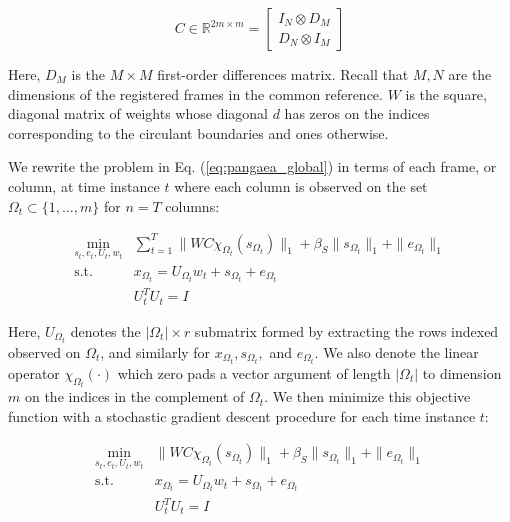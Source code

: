 \documentclass[10pt,twocolumn,letterpaper]{article}
\begin{document}
\begin{equation}
	C \in \mathbb{R}^{2m \times m} = \begin{bmatrix} I_N \otimes D_M \\ D_N \otimes I_M \end{bmatrix}
\end{equation}

\noindent Here, $D_M$ is the $M \times M$ first-order differences matrix. Recall that $M,N$ are the dimensions of the registered frames in the common reference. $W$ is the square, diagonal matrix of weights whose diagonal $d$ has zeros on the indices corresponding to the circulant boundaries and ones otherwise.

We rewrite the problem in Eq. (\ref{eq:pangaea_global}) in terms of each frame, or column, at time instance $t$ where each column is observed on the set $\Omega_t \subset \{1,\hdots,m\}$ for $n=T$ columns:

\begin{equation}
    \begin{split}
        \min_{s_{t},e_t,U_t,w_t} & \sum_{t=1}^T  \|WC\chi_{\Omega_t}(s_{\Omega_t})\|_1 + \beta_S \|s_{\Omega_t}\|_1 + \|e_{\Omega_t}\|_1  \\
	\text{s.t. } & x_{\Omega_t}= U_{\Omega_t}w_t + s_{\Omega_t} + e_{\Omega_t} \\
	&U_t^T U_t = I 
    \end{split}
\end{equation}

\noindent Here, $U_{\Omega_t}$ denotes the $|\Omega_t| \times r$ submatrix formed by extracting the rows indexed observed on $\Omega_t$, and similarly for $x_{\Omega_t}, s_{\Omega_t},$ and $e_{\Omega_t}$. We also denote the linear operator $\chi_{\Omega_t}(\cdot)$ which zero pads a vector argument of length $|\Omega_t|$ to dimension $m$ on the indices in the complement of $\Omega_t$. We then minimize this objective function with a stochastic gradient descent procedure for each time instance $t$:

\begin{equation}
\begin{split}
	\min_{s_{t},e_t,U_t,w_t} & \|WC\chi_{\Omega_t}(s_{\Omega_t})\|_1 + \beta_S\|s_{\Omega_t}\|_1 +  \|e_{\Omega_t}\|_1  \\
	\text{s.t. } & x_{\Omega_t}= U_{\Omega_t}w_t + s_{\Omega_t} + e_{\Omega_t} \\
	&U_{t}^T U_{t} = I 
\end{split}
\label{eq:pangaea_objective}
\end{equation}
\end{document}
